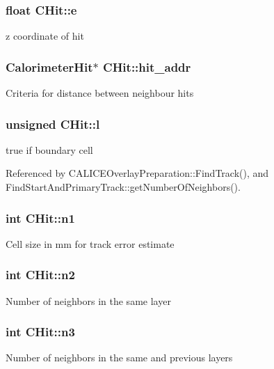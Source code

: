 \subsubsection[{e}]{\setlength{\rightskip}{0pt plus 5cm}float C\-Hit\-::e}\label{classCHit_a350b70c6610b2a393237a14ee2f51310}
z coordinate of hit 
\subsubsection[{hit\-\_\-addr}]{\setlength{\rightskip}{0pt plus 5cm}Calorimeter\-Hit$\ast$ C\-Hit\-::hit\-\_\-addr}\label{classCHit_ade131a1914418c0c30817fe19c02a885}
Criteria for distance between neighbour hits 
\subsubsection[{l}]{\setlength{\rightskip}{0pt plus 5cm}unsigned C\-Hit\-::l}\label{classCHit_ae0fd15bed570010ba641d99302254a8c}
true if boundary cell 

Referenced by C\-A\-L\-I\-C\-E\-Overlay\-Preparation\-::\-Find\-Track(), and Find\-Start\-And\-Primary\-Track\-::get\-Number\-Of\-Neighbors().

\subsubsection[{n1}]{\setlength{\rightskip}{0pt plus 5cm}int C\-Hit\-::n1}\label{classCHit_a50ee336cf5b7ab5da592ad67fd14882a}
Cell size in mm for track error estimate 
\subsubsection[{n2}]{\setlength{\rightskip}{0pt plus 5cm}int C\-Hit\-::n2}\label{classCHit_a3cf1c537b50b1d4ca36bf733cd5e9371}
Number of neighbors in the same layer 
\subsubsection[{n3}]{\setlength{\rightskip}{0pt plus 5cm}int C\-Hit\-::n3}\label{classCHit_a8c2cc381f1da1ad36df39800d13f5be0}
Number of neighbors in the same and previous layers 

